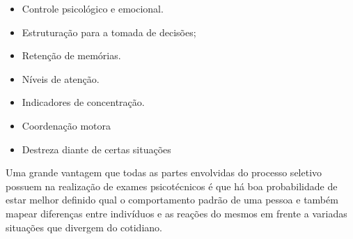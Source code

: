 \documentclass[12pt]{article}
\begin{document}
\begin{itemize}
	\item Controle psicológico e emocional.
	\item Estruturação para a tomada de decisões;
	\item Retenção de memórias.
	\item Níveis de atenção.
	\item Indicadores de concentração.
	\item Coordenação motora
	\item Destreza diante de certas situações
\end{itemize}
Uma grande vantagem que todas as partes envolvidas do processo seletivo possuem na realização de exames psicotécnicos é que há boa probabilidade de estar melhor definido qual o comportamento padrão de uma pessoa e também mapear diferenças entre indivíduos e as reações do mesmos em frente a variadas situações que divergem do cotidiano.
\end{document}
